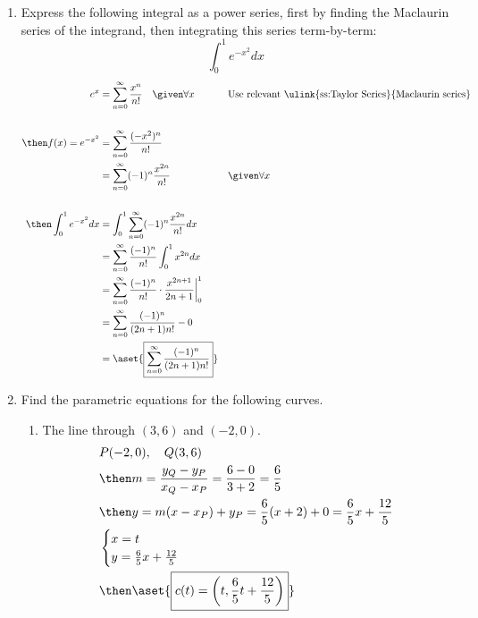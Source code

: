 \begin{enumerate}
  \item Express the following integral as a power series, first by finding the
    Maclaurin series of the integrand, then integrating this series
    term-by-term:
    \[%
    \int_{0}^{1} e^{-x^2}  dx
    \]%
    \begin{align*}
      e^x &= \sum_{n=0}^{\infty} \frac{x^n}{n!} \quad \given \forall x
      && \text{Use relevant \ulink{ss:Taylor Series}{Maclaurin series}} \\
      \\
      \then f(x) = e^{-x^2} &=  \sum_{n=0}^{\infty} \frac{(-x^2)^n}{n!}  \\
                 &= \sum_{n=0}^{\infty} (-1)^n \frac{x^{2n}}{n!}
                 && \given \forall x\\
      \\
      \then \int_{0}^{1} e^{-x^2}  dx
       &= \int_{0}^{1} \sum_{n=0}^{\infty} (-1)^n \frac{x^{2n}}{n!} dx \\
       &= \sum_{n=0}^{\infty} \frac{(-1)^n}{n!} \int_{0}^{1} x^{2n} dx \\
       &= \sum_{n=0}^{\infty} \frac{(-1)^n}{n!} \cdot \frac{x^{2n+1}}{2n+1} \bigg|_{0}^{1} \\
       &= \sum_{n=0}^{\infty} \frac{(-1)^n}{(2n+1)n!}
       - 0 \\
       &= \aset{\boxed{\sum_{n=0}^{\infty} \frac{(-1)^n}{(2n+1)n!}}}
    \end{align*}

\newpage %

  \item Find the parametric equations for the following curves.
    \begin{enumerate}[itemsep=16em]
      \item The line through \((3,6)\) and \((-2, 0)\).
        \begin{align*}
          &P(-2,0), \quad Q(3, 6) \\
          &\then m = \frac{y_Q - y_P}{x_Q - x_P}  = \frac{6-0}{3+2} = \frac{6}{5} \\
          &\then y = m (x-x_P) + y_P = \frac{6}{5}(x+2) + 0 = \frac{6}{5}x + \frac{12}{5}\\
          &\begin{cases}
            x = t \\
            y = \frac{6}{5}x + \frac{12}{5}
          \end{cases}\\
          &\then \aset{\boxed{c(t) = \left( t, \frac{6}{5}t + \frac{12}{5}\right)}}
        \end{align*}


\end{enumerate}
\end{enumerate}
